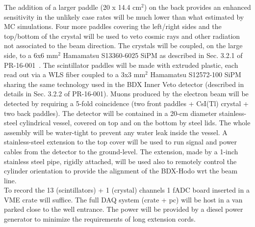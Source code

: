 The addition of a larger paddle (20 x 14.4 cm$^2$) on the back provides an enhanced sensitivity   in the unlikely  case rates will be much lower than what estimated by MC simulations.
Four more  paddles covering  the left/right sides and the top/bottom of the crystal will be used to veto cosmic rays and other radiation not associated to the beam direction.
The crystals will be coupled, on the large side,  to a 6x6 mm$^2$ Hamamatsu S13360-6025 SiPM as described in Sec. 3.2.1 of  PR-16-001~\cite{bdx-proposal}. The scintillator paddles will be  made with extruded plastic, each  read out via a WLS fiber coupled to a 3x3 mm$^2$ Hamamatsu S12572-100 SiPM sharing the same technology used in the BDX Inner Veto detector (described in details in Sec. 3.2.2 of  PR-16-001).
Muons produced by the electron beam will be detected by requiring a 5-fold coincidence (two front paddles + CsI(Tl) crystal + two back  paddles).
The detector will be contained  in a 20-cm diameter stainless-steel cylindrical vessel, covered on top and on the bottom by steel lids. The whole assembly will  be water-tight to prevent any water leak inside the vessel. A stainless-steel  extension to the top cover will be used  to run signal and power cables from the detector to the ground-level. The extension, made by a 1-inch stainless steel pipe,  rigidly attached, will be used also  to remotely control the cylinder orientation to  provide the alignment of the BDX-Hodo wrt the beam line. \\
To record the 13 (scintillators) + 1 (crystal) channels  1 fADC board inserted in a VME crate will suffice. The full DAQ system (crate + pc)  will be host in a van parked close to the well entrance. The power will be provided by a diesel power generator to minimize the requirements of long extension cords.

